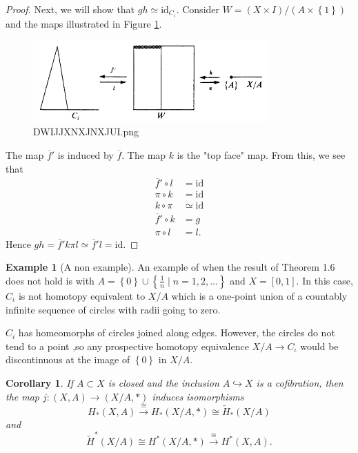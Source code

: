\documentclass[reqno]{amsart}
\newtheorem{corollary}[theorem]{Corollary}
\theoremstyle{definition}
\newtheorem{example}[theorem]{Example}
\theoremstyle{remark}
\newcommand{\id}{{\mathrm{id}}}
\begin{document}
\begin{proof}
    Next, we will show that $gh \simeq \id_{C_{\iota}}$.
    Consider $W = \left( X \times I \right) / 
    \left( A \times \left\{ 1 \right\}  \right) $ 
    and the maps illustrated in Figure \ref{fig:DWIJJXNXJNXJUI-png}.

    \begin{figure}[htpb]
        \centering
        \includegraphics[width=0.8\textwidth]{Figures/DWIJJXNXJNXJUI.png}
        \caption{DWIJJXNXJNXJUI.png}
        \label{fig:DWIJJXNXJNXJUI-png}
    \end{figure}
    The map $\overline{f}'$ is induced by
    $\overline{f}$. The map
    $k$ is the "top face" map.
    From this, we see that
    \begin{align*}
        \overline{f}' \circ l 
        &= \id \\
        \pi \circ k 
        &= \id \\
        k \circ \pi 
        &\simeq \id \\
        \overline{f}' \circ k
        &= g \\
        \pi \circ l 
        &= l.
    \end{align*}
   Hence $g h = \overline{f}' k \pi l 
   \simeq \overline{f}' l = \id$. 
\end{proof}


\begin{example}[A non example]
    An example of when the result
    of Theorem 1.6 does not hold is with
    $A = \left\{ 0 \right\} \cup 
    \left\{ \frac{1}{n} \mid n = 1, 2, \ldots \right\} $ 
    and $X = \left[ 0,1 \right] $.
    In this case, $C_{\iota}$ is not homotopy equivalent
    to $X / A$ which is a one-point union of a countably infinite
    sequence of circles with radii going to zero.

    $C_i$ has homeomorphs of circles joined along edges. However,
    the circles do not tend to a point ,so any prospective homotopy
    equivalence $X / A \to C_{\iota}$ would be discontinuous at
    the image of $\left\{ 0 \right\} $ in $X / A$.
\end{example}

\begin{corollary}\label{Cor:Cofibration-Homology}
    If $A \subset X$ is closed and the inclusion
    $A \hookrightarrow X$ is a cofibration, then the map
    $j \colon \left( X, A \right) \to 
    \left( X / A, * \right) $ induces isomorphisms
    \[
    H_* (X,A) \stackrel{\cong}{\to} 
    H_* \left( X / A, * \right) 
    \cong \tilde{H}_* \left( X / A \right) 
    \] 
    and
    \[
    \tilde{H}^{*}(X /A) \cong
    H^{*} (X / A, *) 
    \stackrel{\cong}{\to} H^{*} (X , A).
    \] 
\end{corollary}
\end{document}
